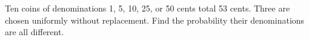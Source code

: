 Ten coins of denominations 1, 5, 10, 25, or 50 cents total 53 cents. Three are chosen uniformly without replacement. Find the probability their denominations are all different.

